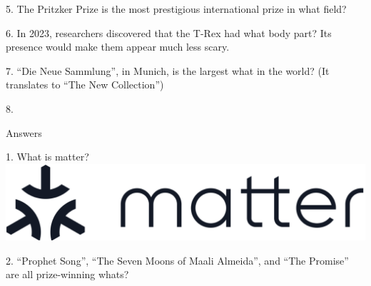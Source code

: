 \begin{frame}
\begin{center}
\Large
5. The Pritzker Prize is the most prestigious international prize in what field?
\end{center}
\end{frame}
\begin{frame}
\begin{center}
\Large
6. In 2023, researchers discovered that the T-Rex had what body part? Its presence would make them appear much less scary.
\end{center}
\end{frame}
\begin{frame}
\begin{center}
\Large
7. ``Die Neue Sammlung'', in Munich, is the largest what in the world? (It translates to ``The New Collection'')
\end{center}
\end{frame}
\begin{frame}
\begin{center}
\Large
8. 
\end{center}
\end{frame}
\begin{frame}
\begin{center}
\Huge
Answers
\end{center}
\end{frame}
\begin{frame}
\begin{center}
\Large
1. What is matter?
\\
\vspace{0.5em}\includegraphics[height=0.25\paperheight]{images/matter.png}
\\
\end{center}
\end{frame}
\begin{frame}
\begin{center}
\Large
2. ``Prophet Song'', ``The Seven Moons of Maali Almeida'', and ``The Promise'' are all prize-winning whats?
\\
\end{center}
\end{frame}
